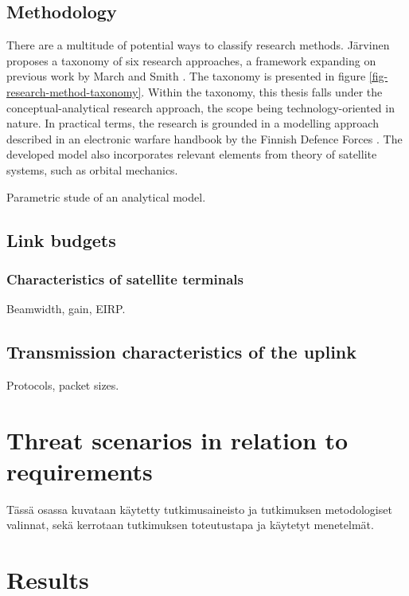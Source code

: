 \documentclass[english, 12pt, a4paper, elec, utf8, a-1b, online]{aaltothesis}
\begin{document}
\subsection{Methodology}

There are a multitude of potential ways to classify research methods. Järvinen \cite{jarvinen} proposes a taxonomy of six research approaches, a framework expanding on previous work by March and Smith \cite{march}.
The taxonomy is presented in figure \ref{fig-research-method-taxonomy}.
Within the taxonomy, this thesis falls under the conceptual-analytical research approach, the scope being technology-oriented in nature.
In practical terms, the research is grounded in a modelling approach described in an electronic warfare handbook by the Finnish Defence Forces \cite{kosola2004elektroninen}.
The developed model also incorporates relevant elements from theory of satellite systems, such as orbital mechanics.

Parametric stude of an analytical model.

\subsection{Link budgets}
\subsubsection{Characteristics of satellite terminals}
Beamwidth, gain, EIRP.

\subsection{Transmission characteristics of the uplink}
Protocols, packet sizes.

\section{Threat scenarios in relation to requirements}
T\"ass\"a osassa kuvataan k\"aytetty tutkimusaineisto ja
tutkimuksen metodologiset valinnat, sek\"a
kerrotaan tutkimuksen toteutustapa ja k\"aytetyt menetelm\"at.

\clearpage

\section{Results}
\end{document}
